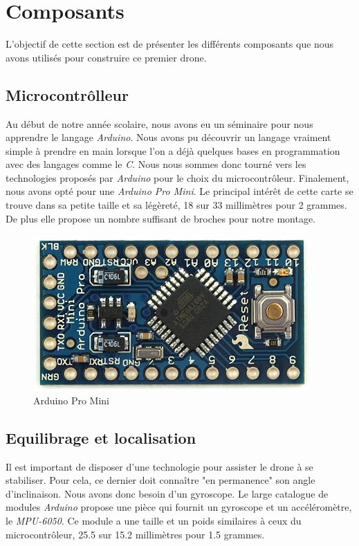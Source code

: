 \documentclass[a4paper,10pt]{report}
\begin{document}
    \section{Composants}
      L'objectif de cette section est de présenter les différents composants que nous avons utilisés pour construire ce premier drone.
      
      \subsection{Microcontrôlleur}
	Au début de notre année scolaire, nous avons eu un séminaire pour nous apprendre le langage \textit{Arduino}. Nous avons pu 
	découvrir un langage vraiment simple à prendre en main lorsque l'on a déjà quelques bases en programmation avec des langages 
	comme le \textit{C}. Nous nous sommes donc tourné vers les technologies proposés par \textit{Arduino} pour le choix du 
	microcontrôleur. Finalement, nous avons opté pour une \textit{Arduino Pro Mini}. Le principal intérêt de cette carte se trouve
	dans sa petite taille et sa légèreté, 18 sur 33 millimètres pour 2 grammes. De plus elle propose un nombre suffisant de broches 
	pour notre montage.
	
	\begin{figure}[htbp]%
	  \centering
	  \includegraphics[scale = 0.25]{img/arduinopromini.jpg}
	  \caption{Arduino Pro Mini}
	  \label{arduinopromini}
	\end{figure}	
	
      \subsection{Equilibrage et localisation}
	Il est important de disposer d'une technologie pour assister le drone à se stabiliser. Pour cela, ce dernier doit connaître
	"en permanence" son angle d'inclinaison. Nous avons donc besoin d'un gyroscope. Le large catalogue de modules \textit{Arduino}
	propose une pièce qui fournit un gyroscope et un accéléromètre, le \textit{MPU-6050}. Ce module a une taille et un poids 
	similaires à ceux du microcontrôleur, 25.5 sur 15.2 millimètres pour 1.5 grammes.
	
\end{document}

